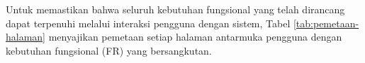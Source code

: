 



Untuk memastikan bahwa seluruh kebutuhan fungsional yang telah dirancang dapat terpenuhi melalui interaksi pengguna dengan sistem, Tabel \ref{tab:pemetaan-halaman} menyajikan pemetaan setiap halaman antarmuka pengguna dengan kebutuhan fungsional (FR) yang bersangkutan.

